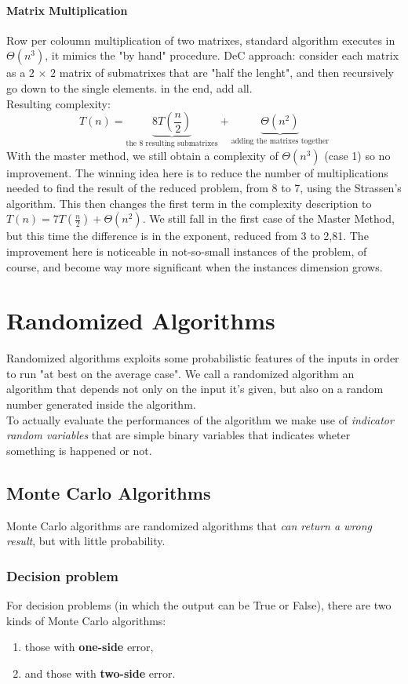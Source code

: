 \documentclass{article}
\begin{document}
			\paragraph{Matrix Multiplication}
				Row per coloumn multiplication of two matrixes, standard algorithm executes in $\Theta(n^3)$, it mimics the "by hand" procedure. DeC approach: consider each matrix as a $2\, \times\, 2$ matrix of submatrixes that are "half the lenght", and then recursively go down to the single elements. in the end, add all.\\
				Resulting complexity:
				\begin{equation}
					T(n) = \underbrace{8T(\frac{n}{2})}_{\text{the 8 resulting submatrixes}} + \underbrace{\Theta(n^2)}_{\text{adding the matrixes together}}
				\end{equation}
				With the master method, we still obtain a complexity of $\Theta(n^3)$ (case 1) so no improvement. The winning idea here is to reduce the number of multiplications needed to find the result of the reduced problem, from 8 to 7, using the Strassen's algorithm. This then changes the first term in the complexity description to $T(n) = 7T(\frac{n}{2}) + \Theta(n^2)$. We still fall in the first case of the Master Method, but this time the difference is in the exponent, reduced from 3 to 2,81. The improvement here is noticeable in not-so-small instances of the problem, of course, and become way more significant when the instances dimension grows.

	\section{Randomized Algorithms}
		Randomized algorithms exploits some probabilistic features of the inputs in order to run "at best on the average case". We call a randomized algorithm an algorithm that depends not only on the input it's given, but also on a random number generated inside the algorithm.\\
		To actually evaluate the performances of the algorithm we make use of \textit{indicator random variables} that are simple binary variables that indicates wheter something is happened or not.

		\subsection{Monte Carlo Algorithms}
			Monte Carlo algorithms are randomized algorithms that \textit{can return a wrong result}, but with little probability.
			\subsubsection{Decision problem}
				For decision problems (in which the output can be True or False), there are two kinds of Monte Carlo algorithms:
				\begin{enumerate}
    			\item those with \textbf{one-side} error, 
    			\item and those with \textbf{two-side} error.
				\end{enumerate}
\end{document}
